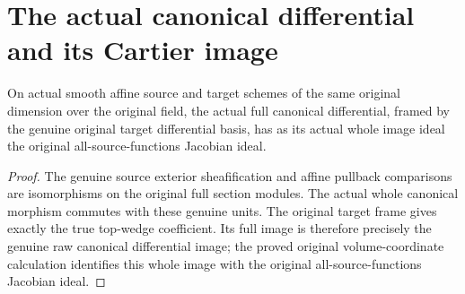 \section{The actual canonical differential and its Cartier image}

\begin{lemma}
\label{lem:kn-blowup-canonical-native-image}
\leanok
On actual smooth affine source and target schemes of the same original
dimension over the original field, the actual full canonical differential,
framed by the genuine original target differential basis, has as its actual
whole image ideal the original all-source-functions Jacobian ideal.
\end{lemma}
\begin{proof}
The genuine source exterior sheafification and affine pullback comparisons
are isomorphisms on the original full section modules. The actual whole
canonical morphism commutes with these genuine units. The original target
frame gives exactly the true top-wedge coefficient. Its full image is
therefore precisely the genuine raw canonical differential image; the
proved original volume-coordinate calculation identifies this whole image
with the original all-source-functions Jacobian ideal.
\end{proof}

